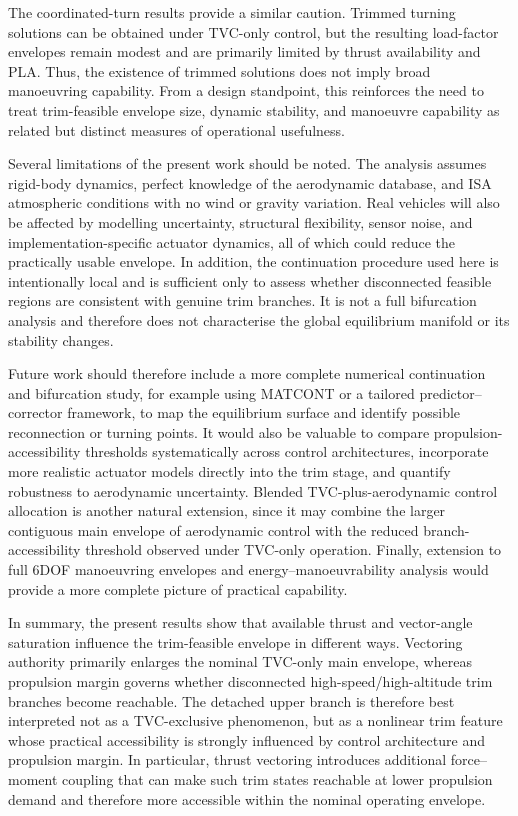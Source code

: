 \documentclass[conf]{new-aiaa}
\begin{document}
The coordinated-turn results provide a similar caution. Trimmed turning solutions can be obtained under TVC-only control, but the resulting load-factor envelopes remain modest and are primarily limited by thrust availability and PLA. Thus, the existence of trimmed solutions does not imply broad manoeuvring capability. From a design standpoint, this reinforces the need to treat trim-feasible envelope size, dynamic stability, and manoeuvre capability as related but distinct measures of operational usefulness.

Several limitations of the present work should be noted. The analysis assumes rigid-body dynamics, perfect knowledge of the aerodynamic database, and ISA atmospheric conditions with no wind or gravity variation. Real vehicles will also be affected by modelling uncertainty, structural flexibility, sensor noise, and implementation-specific actuator dynamics, all of which could reduce the practically usable envelope. In addition, the continuation procedure used here is intentionally local and is sufficient only to assess whether disconnected feasible regions are consistent with genuine trim branches. It is not a full bifurcation analysis and therefore does not characterise the global equilibrium manifold or its stability changes.

Future work should therefore include a more complete numerical continuation and bifurcation study, for example using MATCONT or a tailored predictor--corrector framework, to map the equilibrium surface and identify possible reconnection or turning points. It would also be valuable to compare propulsion-accessibility thresholds systematically across control architectures, incorporate more realistic actuator models directly into the trim stage, and quantify robustness to aerodynamic uncertainty. Blended TVC-plus-aerodynamic control allocation is another natural extension, since it may combine the larger contiguous main envelope of aerodynamic control with the reduced branch-accessibility threshold observed under TVC-only operation. Finally, extension to full 6DOF manoeuvring envelopes and energy--manoeuvrability analysis would provide a more complete picture of practical capability.

In summary, the present results show that available thrust and vector-angle saturation influence the trim-feasible envelope in different ways. Vectoring authority primarily enlarges the nominal TVC-only main envelope, whereas propulsion margin governs whether disconnected high-speed/high-altitude trim branches become reachable. The detached upper branch is therefore best interpreted not as a TVC-exclusive phenomenon, but as a nonlinear trim feature whose practical accessibility is strongly influenced by control architecture and propulsion margin. In particular, thrust vectoring introduces additional force--moment coupling that can make such trim states reachable at lower propulsion demand and therefore more accessible within the nominal operating envelope.
\end{document}
